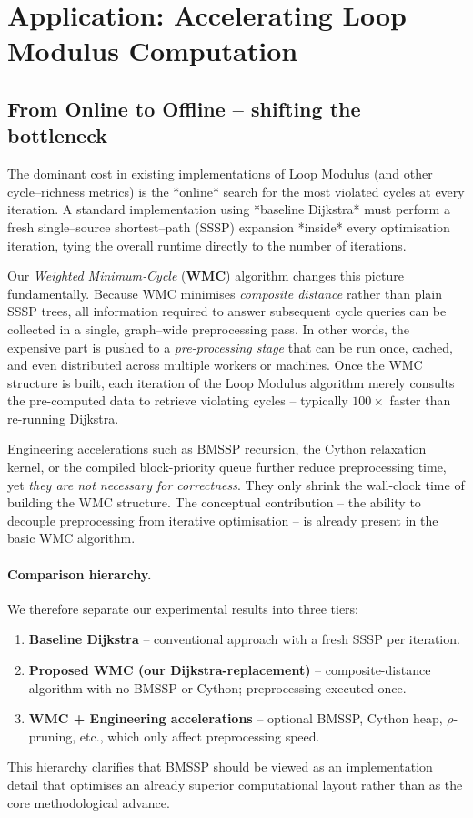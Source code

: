 \documentclass{article}
\begin{document}
\section{Application: Accelerating Loop Modulus Computation}

\subsection*{From Online to Offline – shifting the bottleneck}
The dominant cost in existing implementations of Loop Modulus (and other cycle–richness metrics) is the *online* search for the most violated cycles at every iteration.  A standard implementation using *baseline Dijkstra* must perform a fresh single–source shortest–path (SSSP) expansion *inside* every optimisation iteration, tying the overall runtime directly to the number of iterations.

Our \emph{Weighted Minimum‐Cycle} (\textbf{WMC}) algorithm changes this picture fundamentally.  Because WMC minimises \emph{composite distance} rather than plain SSSP trees, all information required to answer subsequent cycle queries can be collected in a single, graph–wide preprocessing pass.  In other words, the expensive part is pushed to a \emph{pre-processing stage} that can be run once, cached, and even distributed across multiple workers or machines.  Once the WMC structure is built, each iteration of the Loop Modulus algorithm merely consults the pre-computed data to retrieve violating cycles – typically \(100\!\times\) faster than re-running Dijkstra.

Engineering accelerations such as BMSSP recursion, the Cython relaxation kernel, or the compiled block-priority queue further reduce preprocessing time, yet \emph{they are not necessary for correctness}.  They only shrink the wall-clock time of building the WMC structure.  The conceptual contribution – the ability to decouple preprocessing from iterative optimisation – is already present in the basic WMC algorithm.

\paragraph{Comparison hierarchy.}  We therefore separate our experimental results into three tiers:
\begin{enumerate}[leftmargin=*]
  \item \textbf{Baseline Dijkstra} – conventional approach with a fresh SSSP per iteration.
  \item \textbf{Proposed WMC (our Dijkstra-replacement)} – composite-distance algorithm with no BMSSP or Cython; preprocessing executed once.
  \item \textbf{WMC + Engineering accelerations} – optional BMSSP, Cython heap, $\rho$-pruning, etc., which only affect preprocessing speed.
\end{enumerate}
This hierarchy clarifies that BMSSP should be viewed as an implementation detail that optimises an already superior computational layout rather than as the core methodological advance.
\end{document}
